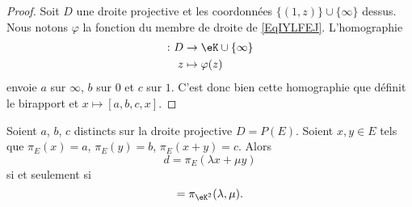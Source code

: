 \begin{proof}
    Soit \( D\) une droite projective et les coordonnées \( \{ (1,z) \}\cup\{ \infty \}\) dessus. Nous notons \( \varphi\) la fonction du membre de droite de \eqref{EqIYLFEJ}. L'homographie
    \begin{equation}
        \begin{aligned}
            \colon D&\to \eK\cup\{ \infty \} \\
            z&\mapsto \varphi(z) 
        \end{aligned}
    \end{equation}
    envoie \( a\) sur \( \infty\), \( b\) sur \( 0\) et \( c\) sur \( 1\). C'est donc bien cette homographie que définit le birapport et \( x\mapsto[a,b,c,x]\).
\end{proof}

\begin{lemma}
    Soient \( a\), \( b\), \( c\) distincts sur la droite projective \( D=P(E)\). Soient \( x,y\in E\) tels que \( \pi_E(x)=a\), \( \pi_E(y)=b\), \( \pi_E(x+y)=c\). Alors
    \begin{equation}
        d=\pi_E(\lambda x+\mu y)
    \end{equation}
    si et seulement si
    \begin{equation}
        [a,b,c,d]=\pi_{\eK^2}(\lambda,\mu).
    \end{equation}
    
\end{lemma}

